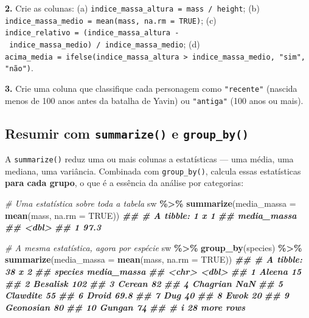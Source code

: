 \documentclass[
  portuguese,
  11pt,
  openany]{book}
\newenvironment{Shaded}{\begin{snugshade}}{\end{snugshade}}
\newcommand{\AttributeTok}[1]{\textcolor[rgb]{0.13,0.29,0.53}{#1}}
\newcommand{\CommentTok}[1]{\textcolor[rgb]{0.56,0.35,0.01}{\textit{#1}}}
\newcommand{\ConstantTok}[1]{\textcolor[rgb]{0.56,0.35,0.01}{#1}}
\newcommand{\DocumentationTok}[1]{\textcolor[rgb]{0.56,0.35,0.01}{\textbf{\textit{#1}}}}
\newcommand{\FunctionTok}[1]{\textcolor[rgb]{0.13,0.29,0.53}{\textbf{#1}}}
\newcommand{\NormalTok}[1]{#1}
\newcommand{\SpecialCharTok}[1]{\textcolor[rgb]{0.81,0.36,0.00}{\textbf{#1}}}
\begin{document}
\textbf{2.} Crie as colunas: (a) \texttt{indice\_massa\_altura\ =\ mass\ /\ height};
(b) \texttt{indice\_massa\_medio\ =\ mean(mass,\ na.rm\ =\ TRUE)};
(c) \texttt{indice\_relativo\ =\ (indice\_massa\_altura\ -\ indice\_massa\_medio)\ /\ indice\_massa\_medio};
(d) \texttt{acima\_media\ =\ ifelse(indice\_massa\_altura\ \textgreater{}\ indice\_massa\_medio,\ "sim",\ "não")}.

\textbf{3.} Crie uma coluna que classifique cada personagem como \texttt{"recente"} (nascida menos
de 100 anos antes da batalha de Yavin) ou \texttt{"antiga"} (100 anos ou mais).

\subsection{\texorpdfstring{Resumir com \texttt{summarize()} e \texttt{group\_by()}}{Resumir com summarize() e group\_by()}}\label{resumir-com-summarize-e-group_by}

A \texttt{summarize()} reduz uma ou mais colunas a estatísticas --- uma média, uma mediana, uma
variância. Combinada com \texttt{group\_by()}, calcula essas estatísticas \textbf{para cada grupo},
o que é a essência da análise por categorias:

\begin{Shaded}
\begin{Highlighting}[]
\CommentTok{\# Uma estatística sobre toda a tabela}
\NormalTok{sw }\SpecialCharTok{\%\textgreater{}\%} \FunctionTok{summarize}\NormalTok{(}\AttributeTok{media\_massa =} \FunctionTok{mean}\NormalTok{(mass, }\AttributeTok{na.rm =} \ConstantTok{TRUE}\NormalTok{))}
\DocumentationTok{\#\# \# A tibble: 1 x 1}
\DocumentationTok{\#\#   media\_massa}
\DocumentationTok{\#\#         \textless{}dbl\textgreater{}}
\DocumentationTok{\#\# 1        97.3}

\CommentTok{\# A mesma estatística, agora por espécie}
\NormalTok{sw }\SpecialCharTok{\%\textgreater{}\%}
  \FunctionTok{group\_by}\NormalTok{(species) }\SpecialCharTok{\%\textgreater{}\%}
  \FunctionTok{summarize}\NormalTok{(}\AttributeTok{media\_massa =} \FunctionTok{mean}\NormalTok{(mass, }\AttributeTok{na.rm =} \ConstantTok{TRUE}\NormalTok{))}
\DocumentationTok{\#\# \# A tibble: 38 x 2}
\DocumentationTok{\#\#    species   media\_massa}
\DocumentationTok{\#\#    \textless{}chr\textgreater{}           \textless{}dbl\textgreater{}}
\DocumentationTok{\#\#  1 Aleena           15  }
\DocumentationTok{\#\#  2 Besalisk        102  }
\DocumentationTok{\#\#  3 Cerean           82  }
\DocumentationTok{\#\#  4 Chagrian        NaN  }
\DocumentationTok{\#\#  5 Clawdite         55  }
\DocumentationTok{\#\#  6 Droid            69.8}
\DocumentationTok{\#\#  7 Dug              40  }
\DocumentationTok{\#\#  8 Ewok             20  }
\DocumentationTok{\#\#  9 Geonosian        80  }
\DocumentationTok{\#\# 10 Gungan           74  }
\DocumentationTok{\#\# \# i 28 more rows}
\end{Highlighting}
\end{Shaded}
\end{document}
